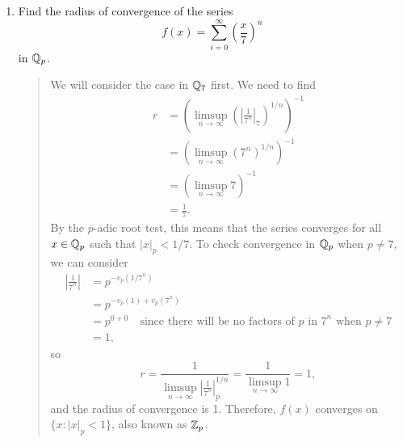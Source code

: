 \documentclass{hw}
\begin{document}
\begin{enumerate}
	\item Find the radius of convergence of the series
	      \[
	      	f(x)=\sum_{i=0}^{\infty}\left(
	      	\frac{x}{7}
	      	\right)^{n}
	      \]
	      in $\mathbb{Q}_{p}$.
	      \begin{quote}
	      	We will consider the case in $\mathbb{Q}_{7}$ first. We need to find
	      	\begin{align*}
	      		r & = \left(\limsup_{n\to\infty}\left(
	      		\left|\frac{1}{7^n}\right|_{7}\right)^{1/n}
	      		\right)^{-1}\\
	      		  & = \left(
	      		\limsup_{n\to\infty}(7^{n})^{1/n}
	      		\right)^{-1}\\
	      		  & = \left(
	      		\limsup_{n\to\infty}7
	      		\right)^{-1}\\
	      		  & = \frac{1}{7}.
	      	\end{align*}
	      	By the $p$-adic root test, this means that the series converges for all $x\in\mathbb{Q}_{p}$ such that $|x|_{p}<1/7$. To check convergence in $\mathbb{Q}_{p}$ when $p\neq 7$, we can consider
	      	\begin{align*}
	      		\left|\frac{1}{7^{n}}\right| & = p^{-v_{p}(1/7^{n})}                                                              \\
	      		                             & = p^{-v_{p}(1) + v_{p}(7^{n})}                                                     \\
	      		                             & = p^{0+0} \quad\text{since there will be no factors of $p$ in $7^n$ when $p\neq7$} \\
	      		                             & = 1,
	      	\end{align*}
	      	so
	      	\[
	      		r = \frac{1}{\limsup_{n\to\infty}\left|\frac{1}{7^{n}}\right|_{p}^{1/n}} =
	      		\frac{1}{\limsup_{n\to\infty}1} = 1,
	      	\]
	      	and the radius of convergence is 1. Therefore, $f(x)$ converges on $\{x : |x|_{p}<1\}$, also known as $\mathbb{Z}_{p}$.
	      \end{quote}


\end{enumerate}
\end{document}
